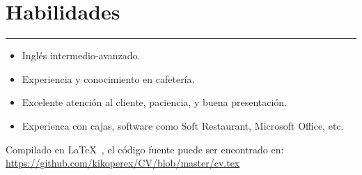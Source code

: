 \documentclass[10pt, a4paper]{article}
\begin{document}
\vspace{0.5cm}

\section*{\bfseries Habilidades}
\hrule
\vspace{0.2cm}
\begin{itemize}
    \item Inglés intermedio-avanzado.
    \item Experiencia y conocimiento en cafetería.
    \item Excelente atención al cliente, paciencia, y buena presentación.
    \item Experienca con cajas, software como Soft Restaurant, Microsoft Office, etc.
\end{itemize}

\vspace{0.9cm}

Compilado en \LaTeX\ , el código fuente puede ser encontrado en: \\
\url{https://github.com/kikoperex/CV/blob/master/cv.tex}
 
\end{document}
